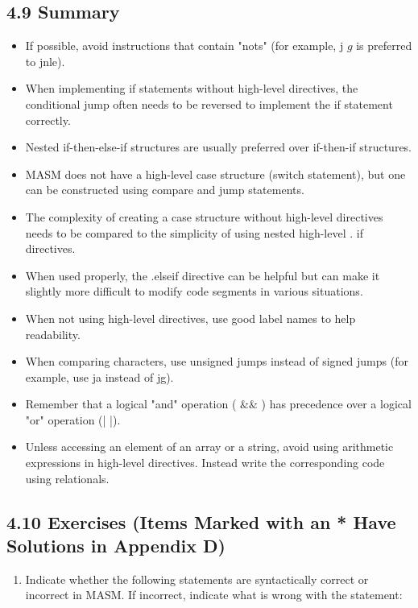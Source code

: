 \documentclass[10pt]{article}
\begin{document}
\subsection*{4.9 Summary}
\begin{itemize}
  \item If possible, avoid instructions that contain "nots" (for example, j $g$ is preferred to jnle).
  \item When implementing if statements without high-level directives, the conditional jump often needs to be reversed to implement the if statement correctly.
  \item Nested if-then-else-if structures are usually preferred over if-then-if structures.
  \item MASM does not have a high-level case structure (switch statement), but one can be constructed using compare and jump statements.
  \item The complexity of creating a case structure without high-level directives needs to be compared to the simplicity of using nested high-level . if directives.
  \item When used properly, the .elseif directive can be helpful but can make it slightly more difficult to modify code segments in various situations.
  \item When not using high-level directives, use good label names to help readability.
  \item When comparing characters, use unsigned jumps instead of signed jumps (for example, use ja instead of jg).
  \item Remember that a logical "and" operation ( $\& \&$ ) has precedence over a logical "or" operation (| |).
  \item Unless accessing an element of an array or a string, avoid using arithmetic expressions in high-level directives. Instead write the corresponding code using relationals.
\end{itemize}

\subsection*{4.10 Exercises (Items Marked with an * Have Solutions in Appendix D)}
\begin{enumerate}
  \item Indicate whether the following statements are syntactically correct or incorrect in MASM. If incorrect, indicate what is wrong with the statement:
\end{enumerate}
\end{document}

